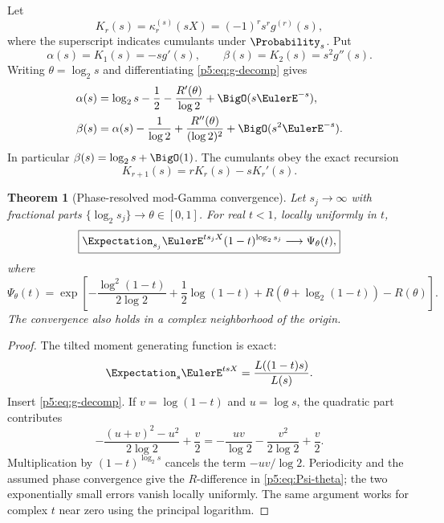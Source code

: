 \documentclass[11pt]{article}
\numberwithin{equation}{section}
\newtheorem{theorem}{Theorem}[section]
\theoremstyle{definition}
\theoremstyle{remark}
\begin{document}
Let
\begin{equation}\label{p5:eq:K-r-def}
 K_r(s)=\kappa_r^{(s)}(sX)=(-1)^rs^rg^{(r)}(s),
\end{equation}
where the superscript indicates cumulants under $\Probability_s$.  Put
\begin{equation}\label{p5:eq:alpha-beta}
 \alpha(s)=K_1(s)=-sg'(s),\qquad
 \beta(s)=K_2(s)=s^2g''(s).
\end{equation}
Writing $\theta=\log_2s$ and differentiating \cref{p5:eq:g-decomp} gives
\begin{align}
 \alpha(s)&=\log_2s-\frac12-
 \frac{R'(\theta)}{\log2}+\BigO(s\EulerE^{-s}),
 \label{p5:eq:alpha-asymp}\\
 \beta(s)&=\alpha(s)-\frac1{\log2}
 +\frac{R''(\theta)}{(\log2)^2}+\BigO(s^2\EulerE^{-s}).
 \label{p5:eq:beta-asymp}
\end{align}
In particular $\beta(s)=\log_2s+\BigO(1)$.  The cumulants obey the exact
recursion
\begin{equation}\label{p5:eq:K-recur}
 K_{r+1}(s)=rK_r(s)-sK_r'(s).
\end{equation}

\begin{theorem}[Phase-resolved mod-Gamma convergence]\label{p5:thm:mod-gamma}
Let $s_j\to\infty$ with fractional parts
$\{\log_2s_j\}\to\theta\in[0,1]$.  For real $t<1$, locally uniformly in $t$,
\begin{equation}\label{p5:eq:mod-gamma}
 \boxed{
 \Expectation_{s_j}\EulerE^{t s_jX}(1-t)^{\log_2s_j}
 \longrightarrow\Psi_\theta(t),}
\end{equation}
where
\begin{equation}\label{p5:eq:Psi-theta}
 \boxed{
 \Psi_\theta(t)=\exp\!\left[
 -\frac{\log^2(1-t)}{2\log2}+\frac12\log(1-t)
 +R\!\left(\theta+\log_2(1-t)\right)-R(\theta)
 \right].}
\end{equation}
The convergence also holds in a complex neighborhood of the origin.
\end{theorem}

\begin{proof}
The tilted moment generating function is exact:
\begin{equation}\label{p5:eq:tilted-mgf-ratio}
 \Expectation_s\EulerE^{tsX}=\frac{L((1-t)s)}{L(s)}.
\end{equation}
Insert \cref{p5:eq:g-decomp}.  If $v=\log(1-t)$ and $u=\log s$, the quadratic
part contributes
\[
 -\frac{(u+v)^2-u^2}{2\log2}+\frac v2
 =-\frac{uv}{\log2}-\frac{v^2}{2\log2}+\frac v2.
\]
Multiplication by $(1-t)^{\log_2s}$ cancels the term $-uv/\log2$.  Periodicity
and the assumed phase convergence give the $R$-difference in
\cref{p5:eq:Psi-theta}; the two exponentially small errors vanish locally
uniformly.  The same argument works for complex $t$ near zero using the
principal logarithm.
\end{proof}
\end{document}
